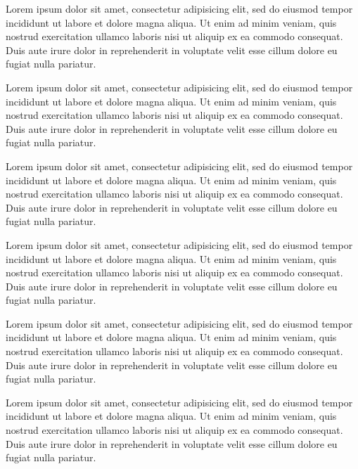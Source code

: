  Lorem ipsum dolor sit amet, consectetur adipisicing elit, sed do eiusmod
tempor incididunt ut labore et dolore magna aliqua. Ut enim ad minim veniam, quis
nostrud exercitation ullamco laboris nisi ut aliquip ex ea commodo consequat. Duis aute
irure dolor in reprehenderit in voluptate velit esse cillum dolore eu fugiat nulla pariatur.


 Lorem ipsum dolor sit amet, consectetur adipisicing elit, sed do eiusmod
tempor incididunt ut labore et dolore magna aliqua. Ut enim ad minim veniam, quis
nostrud exercitation ullamco laboris nisi ut aliquip ex ea commodo consequat. Duis aute
irure dolor in reprehenderit in voluptate velit esse cillum dolore eu fugiat nulla pariatur.


 Lorem ipsum dolor sit amet, consectetur adipisicing elit, sed do eiusmod
tempor incididunt ut labore et dolore magna aliqua. Ut enim ad minim veniam, quis
nostrud exercitation ullamco laboris nisi ut aliquip ex ea commodo consequat. Duis aute
irure dolor in reprehenderit in voluptate velit esse cillum dolore eu fugiat nulla pariatur.


 Lorem ipsum dolor sit amet, consectetur adipisicing elit, sed do eiusmod
tempor incididunt ut labore et dolore magna aliqua. Ut enim ad minim veniam, quis
nostrud exercitation ullamco laboris nisi ut aliquip ex ea commodo consequat. Duis aute
irure dolor in reprehenderit in voluptate velit esse cillum dolore eu fugiat nulla pariatur.


 Lorem ipsum dolor sit amet, consectetur adipisicing elit, sed do eiusmod
tempor incididunt ut labore et dolore magna aliqua. Ut enim ad minim veniam, quis
nostrud exercitation ullamco laboris nisi ut aliquip ex ea commodo consequat. Duis aute
irure dolor in reprehenderit in voluptate velit esse cillum dolore eu fugiat nulla pariatur.


 Lorem ipsum dolor sit amet, consectetur adipisicing elit, sed do eiusmod
tempor incididunt ut labore et dolore magna aliqua. Ut enim ad minim veniam, quis
nostrud exercitation ullamco laboris nisi ut aliquip ex ea commodo consequat. Duis aute
irure dolor in reprehenderit in voluptate velit esse cillum dolore eu fugiat nulla pariatur.
